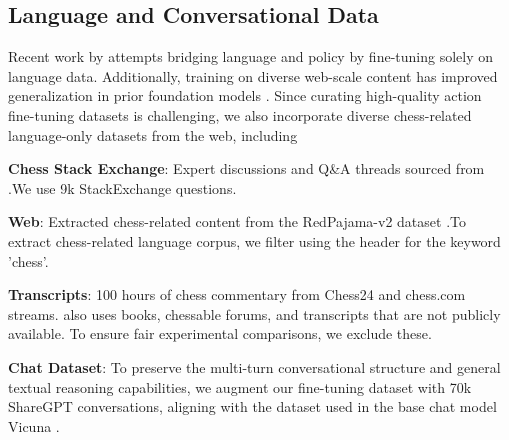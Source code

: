 \subsection{Language and Conversational Data}
Recent work by \citet{feng2024chessgpt} attempts bridging language and policy by fine-tuning solely on language data. Additionally, training on diverse web-scale content has improved generalization in prior foundation models \cite{liu2024improved}. Since curating high-quality action fine-tuning datasets is challenging, we also incorporate diverse chess-related language-only datasets from the web, including

\textbf{Chess Stack Exchange}: Expert discussions and Q\&A threads sourced from \cite{feng2024chessgpt}.We use 9k StackExchange questions.

\textbf{Web}: Extracted chess-related content from the RedPajama-v2 dataset \cite{weber2024redpajama} .To extract chess-related language corpus, we filter using the header for the keyword ’chess’.

\textbf{Transcripts}: 100 hours of chess commentary from Chess24 and chess.com streams. \cite{feng2024chessgpt} also uses books, chessable forums, and transcripts that are not publicly available. To ensure fair experimental comparisons, we exclude these.

\textbf{Chat Dataset}:
To preserve the multi-turn conversational structure and general textual reasoning capabilities, we augment our fine-tuning dataset with 70k ShareGPT conversations, aligning with the dataset used in the base chat model Vicuna \cite{zheng2023judging}.
